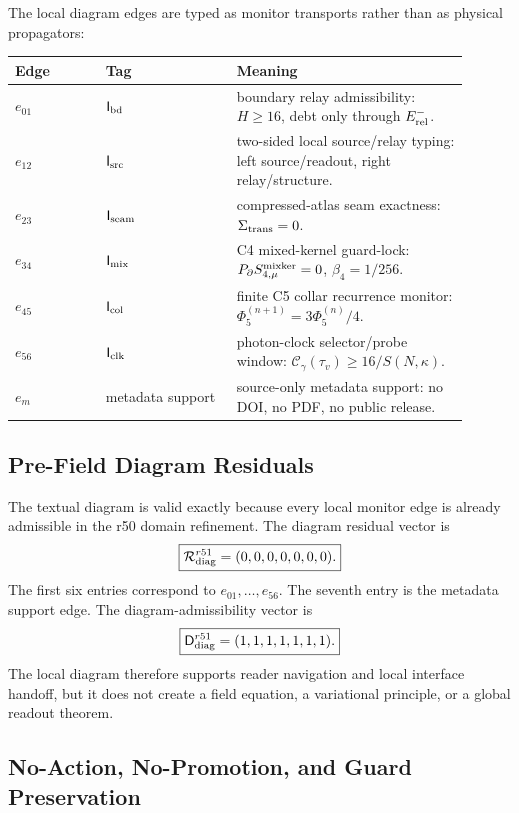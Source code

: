 The local diagram edges are typed as monitor transports rather than as physical
propagators:
\begin{longtable}{P{0.18\linewidth}P{0.26\linewidth}P{0.46\linewidth}}
\toprule
Edge & Tag & Meaning \\
\midrule
\endhead
\(e_{01}\) & \(\mathsf I_{\rm bd}\) & boundary relay admissibility: \(H\ge16\), debt only through \(E_{\rm rel}^{-}\). \\
\(e_{12}\) & \(\mathsf I_{\rm src}\) & two-sided local source/relay typing: left source/readout, right relay/structure. \\
\(e_{23}\) & \(\mathsf I_{\rm seam}\) & compressed-atlas seam exactness: \(\Sigma_{\rm trans}=0\). \\
\(e_{34}\) & \(\mathsf I_{\rm mix}\) & C4 mixed-kernel guard-lock: \(P_{\partial}S_{4,\mu}^{\rm mixker}=0\), \(\beta_4=1/256\). \\
\(e_{45}\) & \(\mathsf I_{\rm col}\) & finite C5 collar recurrence monitor: \(\Phi_5^{(n+1)}=3\Phi_5^{(n)}/4\). \\
\(e_{56}\) & \(\mathsf I_{\rm clk}\) & photon-clock selector/probe window: \(\mathcal C_{\gamma}(\tau_v)\ge16/S(N,\kappa)\). \\
\(e_{m}\) & metadata support & source-only metadata support: no DOI, no PDF, no public release. \\
\bottomrule
\end{longtable}

\subsection{Pre-Field Diagram Residuals}
\label{subsec:r51-prefield-diagram-residuals}

The textual diagram is valid exactly because every local monitor edge is already
admissible in the r50 domain refinement.  The diagram residual vector is
\[
\boxed{
\mathcal R_{\rm diag}^{r51}=(0,0,0,0,0,0,0).
}
\]
The first six entries correspond to \(e_{01},\ldots,e_{56}\).  The seventh entry
is the metadata support edge.  The diagram-admissibility vector is
\[
\boxed{
\mathsf D_{\rm diag}^{r51}=(1,1,1,1,1,1,1).
}
\]
The local diagram therefore supports reader navigation and local interface
handoff, but it does not create a field equation, a variational principle, or a
global readout theorem.

\subsection{No-Action, No-Promotion, and Guard Preservation}
\label{subsec:r51-no-action-guard}

